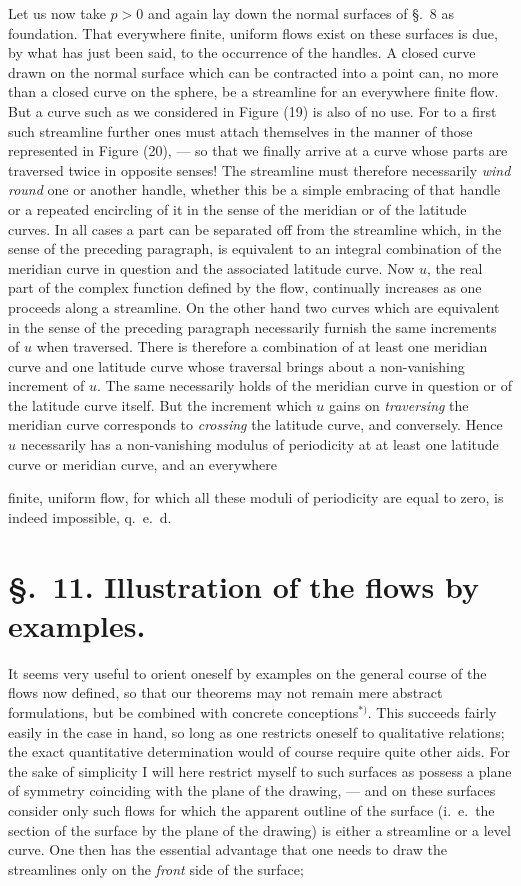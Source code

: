 \documentclass{article}
\begin{document}
Let us now take $p > 0$ and again lay down the normal surfaces of §.~8 as foundation. That everywhere finite, uniform flows exist on these surfaces is due, by what has just been said, to the occurrence of the handles. A closed curve drawn on the normal surface which can be contracted into a point can, no more than a closed curve on the sphere, be a streamline for an everywhere finite flow. But a curve such as we considered in Figure (19) is also of no use. For to a first such streamline further ones must attach themselves in the manner of those represented in Figure (20), --- so that we finally arrive at a curve whose parts are traversed twice in opposite senses! The streamline must therefore necessarily \emph{wind round} one or another handle, whether this be a simple embracing of that handle or a repeated encircling of it in the sense of the meridian or of the latitude curves. In all cases a part can be separated off from the streamline which, in the sense of the preceding paragraph, is equivalent to an integral combination of the meridian curve in question and the associated latitude curve. Now $u$, the real part of the complex function defined by the flow, continually increases as one proceeds along a streamline. On the other hand two curves which are equivalent in the sense of the preceding paragraph necessarily furnish the same increments of $u$ when traversed. There is therefore a combination of at least one meridian curve and one latitude curve whose traversal brings about a non-vanishing increment of $u$. The same necessarily holds of the meridian curve in question or of the latitude curve itself. But the increment which $u$ gains on \emph{traversing} the meridian curve corresponds to \emph{crossing} the latitude curve, and conversely. Hence $u$ necessarily has a non-vanishing modulus of periodicity at at least one latitude curve or meridian curve, and an everywhere

finite, uniform flow, for which all these moduli of periodicity are equal to zero, is indeed impossible, q.\ e.\ d.

\section*{§.~11. Illustration of the flows by examples.}

It seems very useful to orient oneself by examples on the general course of the flows now defined, so that our theorems may not remain mere abstract formulations, but be combined with concrete conceptions${}^{*)}$. This succeeds fairly easily in the case in hand, so long as one restricts oneself to qualitative relations; the exact quantitative determination would of course require quite other aids. For the sake of simplicity I will here restrict myself to such surfaces as possess a plane of symmetry coinciding with the plane of the drawing, --- and on these surfaces consider only such flows for which the apparent outline of the surface (i.\ e.\ the section of the surface by the plane of the drawing) is either a streamline or a level curve. One then has the essential advantage that one needs to draw the streamlines only on the \emph{front} side of the surface;
\end{document}
